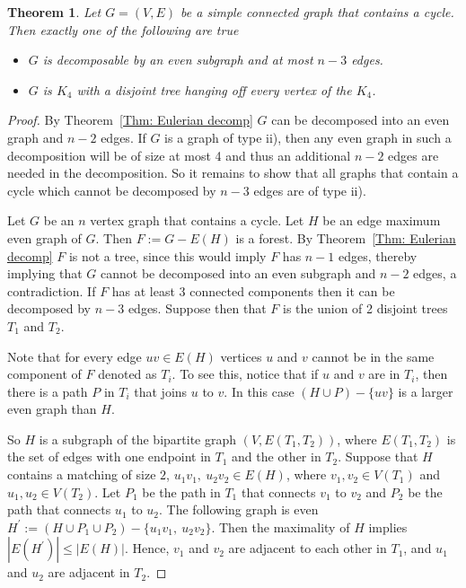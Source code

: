 \documentclass[11pt]{amsart}
\newtheorem{theorem}{Theorem}[section]
\theoremstyle{definition}
\begin{document}
\begin{theorem}\label{Thm: n-3 even}
Let $G = (V,E)$ be a simple connected graph that contains a cycle. Then exactly one of the following are true
\begin{itemize}
\item[i)] $G$ is decomposable by an even subgraph and at most $n-3$ edges.
\item[ii)] $G$ is $K_4$ with a disjoint tree hanging off every vertex of the $K_4$.
\end{itemize}
\end{theorem}
\begin{proof}
By Theorem~\ref{Thm: Eulerian decomp} $G$ can be decomposed into an even graph and $n-2$ edges. 
If $G$ is a graph of type ii), then any even graph in such a decomposition will be of size at most 4 and thus an additional $n-2$ edges are needed in the decomposition.
So it remains to show that all graphs that contain a cycle which cannot be decomposed by $n-3$ edges are of type ii).

Let $G$ be an $n$ vertex graph that contains a cycle.
Let $H$ be an edge maximum even graph of $G$.
Then $F:=G - E(H)$ is a forest. 
By Theorem~\ref{Thm: Eulerian decomp} $F$ is not a tree, 
since this would imply $F$ has $n-1$ edges, 
thereby implying that $G$ cannot be decomposed into an even subgraph and $n-2$ edges, a contradiction.
If $F$ has at least $3$ connected components then it can be decomposed by $n-3$ edges. 
Suppose then that $F$ is the union of 2 disjoint trees $T_1$ and $T_2$. 

Note that for every edge $uv\in E(H)$ vertices $u$ and $v$ cannot be in the same component of $F$ denoted as $T_i$.
To see this, notice that if $u$ and $v$ are in $T_i$, then
there is a path $P$ in $ T_i$ that joins $u$ to $v$.
In this case $(H\cup P) - \{uv\}$ is a larger even graph than $H$.


So $H$ is a subgraph of the bipartite graph $(V,E(T_1,T_2))$,
where $E(T_1,T_2)$ is the set of edges with one endpoint in $T_1$ and the other in $T_2$.
Suppose that $H$ contains a matching of size $2$,
$u_1v_1,~u_2v_2\in E(H)$,
where $v_1,v_2\in V(T_1)$ and $u_1,u_2\in V(T_2)$.
Let $P_1$ be the path in $T_1$ that connects $v_1$ to $v_2$ and $P_2$ be the path that connects $u_1$ to $u_2$. 
The following graph is even $H^\prime:= (H\cup P_1\cup P_2) - \{u_1v_1,~u_2v_2\}$.
Then the maximality of $H$ implies $|E(H^\prime)| \leq |E(H)|$.
Hence, $v_1$ and $v_2$ are adjacent to each other in $T_1$, and $u_1$ and $u_2$ are adjacent in $T_2$. 


\end{proof}
\end{document}
